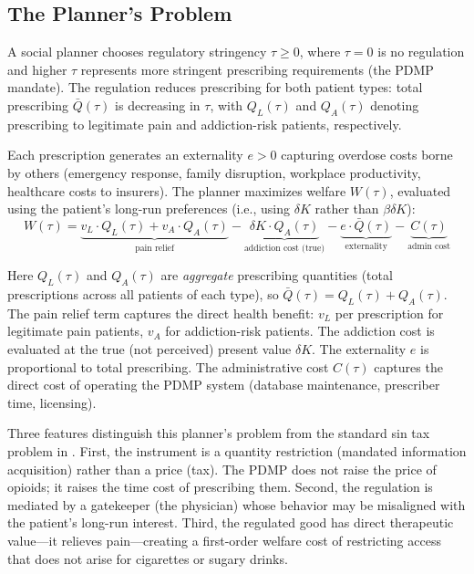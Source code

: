 \documentclass[12pt]{article}
\begin{document}
\subsection{The Planner's Problem}\label{sec:framework_planner}

A social planner chooses regulatory stringency $\tau \geq 0$, where $\tau = 0$ is no regulation and higher $\tau$ represents more stringent prescribing requirements (the PDMP mandate). The regulation reduces prescribing for both patient types: total prescribing $\bar{Q}(\tau)$ is decreasing in $\tau$, with $Q_L(\tau)$ and $Q_A(\tau)$ denoting prescribing to legitimate pain and addiction-risk patients, respectively.

Each prescription generates an externality $e > 0$ capturing overdose costs borne by others (emergency response, family disruption, workplace productivity, healthcare costs to insurers). The planner maximizes welfare $W(\tau)$, evaluated using the patient's long-run preferences (i.e., using $\delta K$ rather than $\beta \delta K$):
\begin{equation}\label{eq:planner}
W(\tau) = \underbrace{v_L \cdot Q_L(\tau) + v_A \cdot Q_A(\tau)}_{\text{pain relief}} - \underbrace{\delta K \cdot Q_A(\tau)}_{\text{addiction cost (true)}} - \underbrace{e \cdot \bar{Q}(\tau)}_{\text{externality}} - \underbrace{C(\tau)}_{\text{admin cost}}
\end{equation}

Here $Q_L(\tau)$ and $Q_A(\tau)$ are \textit{aggregate} prescribing quantities (total prescriptions across all patients of each type), so $\bar{Q}(\tau) = Q_L(\tau) + Q_A(\tau)$. The pain relief term captures the direct health benefit: $v_L$ per prescription for legitimate pain patients, $v_A$ for addiction-risk patients. The addiction cost is evaluated at the true (not perceived) present value $\delta K$. The externality $e$ is proportional to total prescribing. The administrative cost $C(\tau)$ captures the direct cost of operating the PDMP system (database maintenance, prescriber time, licensing).

Three features distinguish this planner's problem from the standard sin tax problem in \citet{allcott2019regressive}. First, the instrument is a quantity restriction (mandated information acquisition) rather than a price (tax). The PDMP does not raise the price of opioids; it raises the time cost of prescribing them. Second, the regulation is mediated by a gatekeeper (the physician) whose behavior may be misaligned with the patient's long-run interest. Third, the regulated good has direct therapeutic value---it relieves pain---creating a first-order welfare cost of restricting access that does not arise for cigarettes or sugary drinks.
\end{document}
